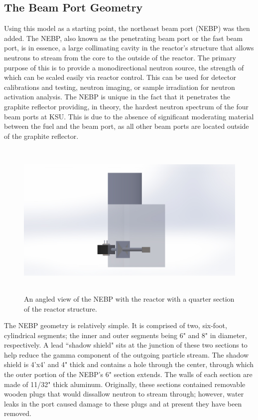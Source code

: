 \subsection{The Beam Port Geometry}

Using this model as a starting point, the northeast beam port (NEBP) was then added.
The NEBP, also known as the penetrating beam port or the fast beam port, is in essence, a large collimating cavity in the reactor's structure that allows neutrons to stream from the core to the outside of the reactor.
The primary purpose of this is to provide a monodirectional neutron source, the strength of which can be scaled easily via reactor control.
This can be used for detector calibrations and testing, neutron imaging, or sample irradiation for neutron activation analysis.
The NEBP is unique in the fact that it penetrates the graphite reflector providing, in theory, the hardest neutron spectrum of the four beam ports at KSU.
This is due to the absence of significant moderating material between the fuel and the beam port, as all other beam ports are located outside of the graphite reflector.

\begin{figure}[htb]
\centering
\includegraphics[height=3in]{tex/figures/solidworksangled.jpg}
\caption[Solidworks Angled NEBP]{An angled view of the NEBP with the reactor with a quarter section of the reactor structure.}
\label{fig:solidworksangled}
\end{figure}


The NEBP geometry is relatively simple.
It is comprised of two, six-foot, cylindrical segments; the inner and outer segments being 6" and 8" in diameter, respectively.
A lead ``shadow shield" sits at the junction of these two sections to help reduce the gamma component of the outgoing particle stream.
The shadow shield is 4'x4' and 4" thick and contains a hole through the center, through which the outer portion of the NEBP's 6" section extends.
The walls of each section are made of 11/32" thick aluminum.
Originally, these sections contained removable wooden plugs that would dissallow neutron to stream through; however, water leaks in the port caused damage to these plugs and at present they have been removed.

